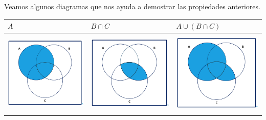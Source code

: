 \documentclass[
  letterpaper,
  DIV=11,
  numbers=noendperiod]{scrreprt}
\begin{document}
Veamos algunos diagramas que nos ayuda a demostrar las propiedades
anteriores.

\begin{longtable}[]{@{}
  >{\centering\arraybackslash}p{}
  >{\centering\arraybackslash}p{}
  >{\centering\arraybackslash}p{}@{}}
\toprule\noalign{}
\begin{minipage}[b]{\linewidth}\centering
\(A\)
\end{minipage} & \begin{minipage}[b]{\linewidth}\centering
\(B\cap C\)
\end{minipage} & \begin{minipage}[b]{\linewidth}\centering
\(A\cup (B\cap C)\)
\end{minipage} \\
\midrule\noalign{}
\endhead
\bottomrule\noalign{}
\endlastfoot
\includegraphics[width=\linewidth,height=1.5625in,keepaspectratio]{Images/venn1A.jpeg}
&
\includegraphics[width=\linewidth,height=1.5625in,keepaspectratio]{Images/venn1ByC.jpeg}
&
\includegraphics[width=\linewidth,height=1.5625in,keepaspectratio]{Images/venn1AUByC.jpeg} \\
\end{longtable}
\end{document}

